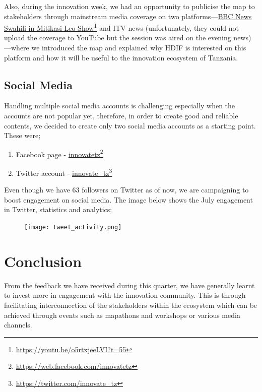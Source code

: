 \documentclass[a4paper,12pt,twoside]{article}
\begin{document}
Also, during the innovation week, we had an opportunity to publicise the map to stakeholders through mainstream media coverage on two platforms---\href{https://youtu.be/o5rtxjeeLVI?t=55}{BBC News Swahili in Mitikasi Leo Show}\footnote{\url{https://youtu.be/o5rtxjeeLVI?t=55}} and ITV news (unfortunately, they could not upload the coverage to YouTube but the session was aired on the evening news)---where we introduced the map and explained why HDIF is interested on this platform and how it will be useful to the innovation ecosystem of Tanzania.

\subsection{Social Media}
Handling multiple social media accounts is challenging especially when the accounts are not popular yet, therefore, in order to create good and reliable contents, we decided to create only two social media accounts as a starting point. These were;

\begin{enumerate}
	\item Facebook page - \href{https://web.facebook.com/innovatetz}{innovatetz}\footnote{\url{https://web.facebook.com/innovatetz}}
	\item Twitter account - \href{https://twitter.com/innovate_tz}{innovate\_tz}\footnote{\url{https://twitter.com/innovate_tz}}
\end{enumerate}

Even though we have 63 followers on Twitter as of now, we are campaigning to boost engagement on social media. The image below shows the July engagement in Twitter, statistics and analytics; 

\begin{figure}[h]
    \centering
    \texttt{[image: tweet\_activity.png]}
\end{figure}

\newpage
\section{Conclusion}
From the feedback we have received during this quarter, we have generally learnt to invest more in engagement with the innovation community. This is through facilitating interconnection of the stakeholders within the ecosystem which can be achieved through events such as mapathons and workshops or various media channels.
\end{document}

